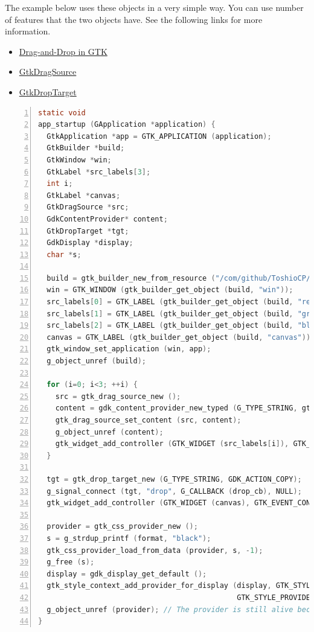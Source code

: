 The example below uses these objects in a very simple way. You can use
number of features that the two objects have. See the following links
for more information.

\begin{itemize}
\tightlist
\item
  \href{https://docs.gtk.org/gtk4/drag-and-drop.html}{Drag-and-Drop in
  GTK}
\item
  \href{https://docs.gtk.org/gtk4/class.DragSource.html}{GtkDragSource}
\item
  \href{https://docs.gtk.org/gtk4/class.DropTarget.html}{GtkDropTarget}
\end{itemize}

\begin{lstlisting}[language=C, numbers=left]
static void
app_startup (GApplication *application) {
  GtkApplication *app = GTK_APPLICATION (application);
  GtkBuilder *build;
  GtkWindow *win;
  GtkLabel *src_labels[3];
  int i;
  GtkLabel *canvas;
  GtkDragSource *src;
  GdkContentProvider* content;
  GtkDropTarget *tgt;
  GdkDisplay *display;
  char *s;

  build = gtk_builder_new_from_resource ("/com/github/ToshioCP/dnd/dnd.ui");
  win = GTK_WINDOW (gtk_builder_get_object (build, "win"));
  src_labels[0] = GTK_LABEL (gtk_builder_get_object (build, "red"));
  src_labels[1] = GTK_LABEL (gtk_builder_get_object (build, "green"));
  src_labels[2] = GTK_LABEL (gtk_builder_get_object (build, "blue"));
  canvas = GTK_LABEL (gtk_builder_get_object (build, "canvas"));
  gtk_window_set_application (win, app);
  g_object_unref (build);

  for (i=0; i<3; ++i) {
    src = gtk_drag_source_new ();
    content = gdk_content_provider_new_typed (G_TYPE_STRING, gtk_widget_get_name (GTK_WIDGET (src_labels[i])));
    gtk_drag_source_set_content (src, content);
    g_object_unref (content);
    gtk_widget_add_controller (GTK_WIDGET (src_labels[i]), GTK_EVENT_CONTROLLER (src)); // The ownership of src is taken by the instance.
  }

  tgt = gtk_drop_target_new (G_TYPE_STRING, GDK_ACTION_COPY);
  g_signal_connect (tgt, "drop", G_CALLBACK (drop_cb), NULL);
  gtk_widget_add_controller (GTK_WIDGET (canvas), GTK_EVENT_CONTROLLER (tgt)); // The ownership of tgt is taken by the instance.

  provider = gtk_css_provider_new ();
  s = g_strdup_printf (format, "black");
  gtk_css_provider_load_from_data (provider, s, -1);
  g_free (s);
  display = gdk_display_get_default ();
  gtk_style_context_add_provider_for_display (display, GTK_STYLE_PROVIDER (provider),
                                              GTK_STYLE_PROVIDER_PRIORITY_APPLICATION);
  g_object_unref (provider); // The provider is still alive because the display owns it.
}
\end{lstlisting}

